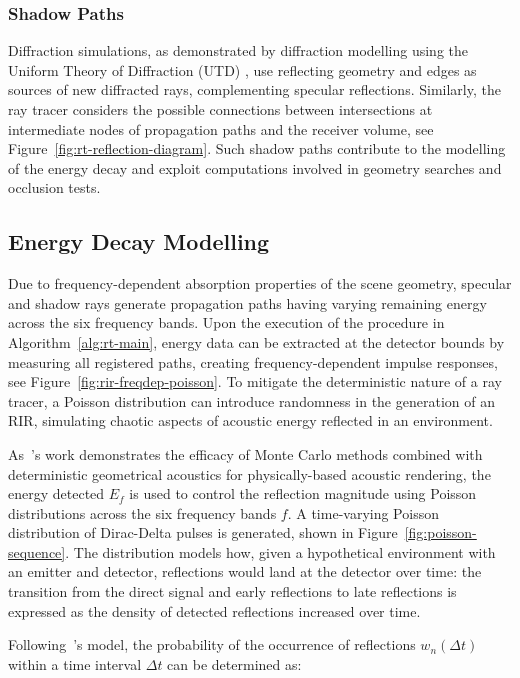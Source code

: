 \subsubsection{Shadow Paths}
Diffraction simulations, as demonstrated by diffraction modelling using the Uniform Theory of Diffraction (UTD) \cite{tsingos2001modeling}, use reflecting geometry and edges as sources of new diffracted rays, complementing specular reflections. Similarly, the ray tracer considers the possible connections between intersections at intermediate nodes of propagation paths and the receiver volume, see Figure~\ref{fig:rt-reflection-diagram}. Such shadow paths contribute to the modelling of the energy decay and exploit computations involved in geometry searches and occlusion tests. \par

\subsection{Energy Decay Modelling}
Due to frequency-dependent absorption properties of the scene geometry, specular and shadow rays generate propagation paths having varying remaining energy across the six frequency bands. Upon the execution of the procedure in Algorithm~\ref{alg:rt-main}, energy data can be extracted at the detector bounds by measuring all registered paths, creating frequency-dependent impulse responses, see Figure~\ref{fig:rir-freqdep-poisson}. To mitigate the deterministic nature of a ray tracer, a Poisson distribution can introduce randomness in the generation of an RIR, simulating chaotic aspects of acoustic energy reflected in an environment. \par
As~\cite{schroder2011physically}'s work demonstrates the efficacy of Monte Carlo methods combined with deterministic geometrical acoustics for physically-based acoustic rendering, the energy detected $E_f$ is used to control the reflection magnitude using Poisson distributions across the six frequency bands $f$. A time-varying Poisson distribution of Dirac-Delta pulses is generated, shown in Figure~\ref{fig:poisson-sequence}. The distribution models how, given a hypothetical environment with an emitter and detector, reflections would land at the detector over time: the transition from the direct signal and early reflections to late reflections is expressed as the density of detected reflections increased over time. \par
Following~\cite{schroder2011physically}'s model, the probability of the occurrence of reflections $w_n(\Delta t)$ within a time interval $\Delta t$ can be determined as:
